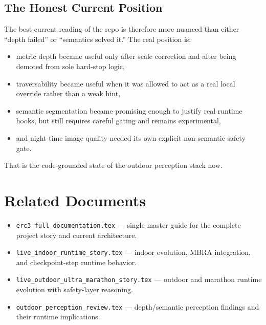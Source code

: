 \documentclass[11pt]{article}
\begin{document}
\subsection{The Honest Current Position}
The best current reading of the repo is therefore more nuanced than either ``depth failed'' or ``semantics solved it.'' The real position is:
\begin{itemize}[leftmargin=*]
\item metric depth became useful only after scale correction and after being demoted from sole hard-stop logic,
\item traversability became useful when it was allowed to act as a real local override rather than a weak hint,
\item semantic segmentation became promising enough to justify real runtime hooks, but still requires careful gating and remains experimental,
\item and night-time image quality needed its own explicit non-semantic safety gate.
\end{itemize}

That is the code-grounded state of the outdoor perception stack now.


\section{Related Documents}
\begin{itemize}
  \item \texttt{erc3\_full\_documentation.tex} --- single master guide for the complete project story and current architecture.
  \item \texttt{live\_indoor\_runtime\_story.tex} --- indoor evolution, MBRA integration, and checkpoint-step runtime behavior.
  \item \texttt{live\_outdoor\_ultra\_marathon\_story.tex} --- outdoor and marathon runtime evolution with safety-layer reasoning.
  \item \texttt{outdoor\_perception\_review.tex} --- depth/semantic perception findings and their runtime implications.
\end{itemize}
\end{document}

